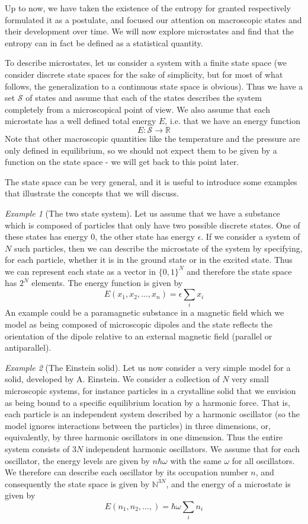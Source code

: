 \documentclass[a4paper, draft]{article}
\theoremstyle{own}
\theoremstyle{remark}
\newtheorem{example}{Example}[section]
\newcommand{\R}{\mathbb{R}}
\newcommand{\N}{\mathbb{N}}
\begin{document}
Up to now, we have taken the existence of the entropy for granted respectively formulated it as a postulate, and focused our attention on macroscopic states and their development over time. We will now explore microstates and find that the entropy can in fact be defined as a statistical quantity. 

To describe microstates, let us consider a system with a finite state space (we consider discrete state spaces for the sake of simplicity, but for most of what follows, the generalization to a continuous state space is obvious). Thus we have a set
${\mathcal S}$ of states and assume that each of the states describes the system completely from a microscopical point of view. We also assume that each microstate has a well defined total energy $E$, i.e. that we have an energy function 
$$
E \colon {\mathcal S} \rightarrow \R
$$
Note that other macroscopic quantities like the temperature and the pressure are only defined in equilibrium, so we should not expect them to be given by a function on the state space - we will get back to this point later.

The state space can be very general, and it is useful to introduce some examples that illustrate the concepts that we will discuss.

\begin{example}[The two state system]
Let us assume that we have a substance which is composed of particles that only have two possible discrete states. One of these states has energy 0, the other state has energy $\epsilon$. If we consider a system of $N$ such particles, then we can describe the microstate of the system by specifying, for each particle, whether it is in the ground state or in the excited state. Thus we can represent each state as a vector in $\{0,1\}^N$ and therefore the state space has $2^N$ elements. The energy function is given by
$$
E(x_1, x_2, \dots, x_n) = \epsilon\sum_i x_i
$$
An example could be a paramagnetic substance in a magnetic field which we model as being composed of microscopic dipoles and the state reflects the orientation of the dipole relative to an external magnetic field (parallel or antiparallel).
\end{example}

\begin{example}[The Einstein solid]
Let us now consider a very simple model for a solid, developed by A. Einstein. We consider a collection of $N$ very small microscopic systems, for instance particles in a crystalline solid that we envision as being bound to a specific equilibrium location by a harmonic force. That is, each particle is an independent system described by a harmonic oscillator (so the model ignores interactions between the particles) in three dimensions, or, equivalently, by three harmonic oscillators in one dimension. Thus the entire system consists of $3N$ independent harmonic oscillators. We assume that for each oscillator, the energy levels are given by $n \hbar \omega$ with the same $\omega$ for all oscillators. We therefore can describe each oscillator by its occupation number $n$, and consequently the state space is given by ${\N}^{3N}$, and the energy of a microstate is given by
$$
E(n_1, n_2, \dots, ) = \hbar \omega \sum_i n_i
$$
\end{example}
\end{document}
